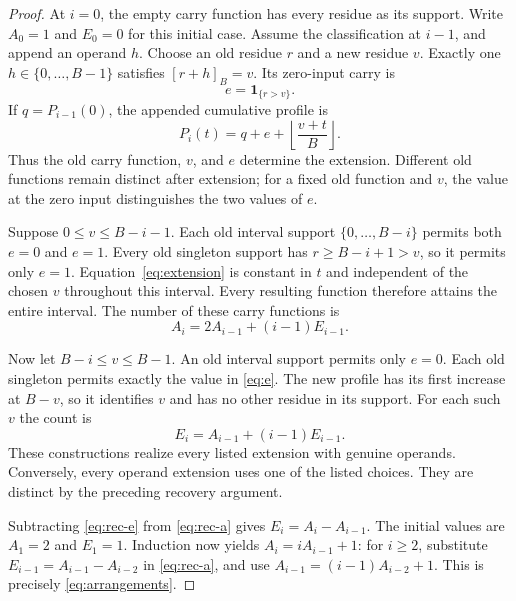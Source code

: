 \documentclass[11pt,a4paper]{article}
\theoremstyle{definition}\newtheorem{definition}[theorem]{Definition}
\newcommand{\ind}{\mathbf 1}
\begin{document}
\begin{proof}
At $i=0$, the empty carry function has every residue as its support.
Write $A_0=1$ and $E_0=0$ for this initial case.
Assume the classification at $i-1$, and append an operand $h$.
Choose an old residue $r$ and a new residue $v$.
Exactly one $h\in\{0,\ldots,B-1\}$ satisfies $[r+h]_B=v$.
Its zero-input carry is
\begin{equation}\label{eq:e}
 e=\ind_{\{r>v\}}.
\end{equation}
If $q=P_{i-1}(0)$, the appended cumulative profile is
\begin{equation}\label{eq:extension}
 P_i(t)=q+e+\left\lfloor\frac{v+t}{B}\right\rfloor.
\end{equation}
Thus the old carry function, $v$, and $e$ determine the extension.
Different old functions remain distinct after extension; for a fixed old
function and $v$, the value at the zero input distinguishes the two values
of $e$.

Suppose $0\leq v\leq B-i-1$. Each old interval support
$\{0,\ldots,B-i\}$ permits both $e=0$ and $e=1$.
Every old singleton support has $r\geq B-i+1>v$, so it permits only $e=1$.
Equation~\eqref{eq:extension} is constant in $t$ and independent of the
chosen $v$ throughout this interval. Every resulting function therefore
attains the entire interval. The number of these carry functions is
\begin{equation}\label{eq:rec-a}
 A_i=2A_{i-1}+(i-1)E_{i-1}.
\end{equation}

Now let $B-i\leq v\leq B-1$. An old interval support permits only $e=0$.
Each old singleton permits exactly the value in \eqref{eq:e}.
The new profile has its first increase at $B-v$, so it identifies $v$
and has no other residue in its support. For each such $v$ the count is
\begin{equation}\label{eq:rec-e}
 E_i=A_{i-1}+(i-1)E_{i-1}.
\end{equation}
These constructions realize every listed extension with genuine operands.
Conversely, every operand extension uses one of the listed choices.
They are distinct by the preceding recovery argument.

Subtracting \eqref{eq:rec-e} from \eqref{eq:rec-a} gives
$E_i=A_i-A_{i-1}$. The initial values are $A_1=2$ and $E_1=1$.
Induction now yields $A_i=iA_{i-1}+1$:
for $i\geq2$, substitute $E_{i-1}=A_{i-1}-A_{i-2}$ in
\eqref{eq:rec-a}, and use
$A_{i-1}=(i-1)A_{i-2}+1$.
This is precisely \eqref{eq:arrangements}.
\end{proof}
\end{document}

